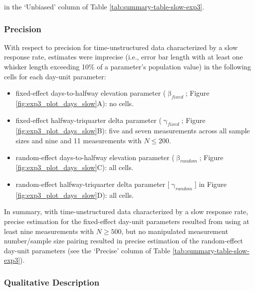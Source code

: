 \documentclass[
12pt, %
twoside,
english]{guelphthesis}
\begin{document}
in the `Unbiased' column of Table \ref{tab:summary-table-slow-exp3}.

\hypertarget{precision-slow-exp3}{%
\subsubsection{Precision}\label{precision-slow-exp3}}

With respect to precision for time-unstructured data characterized by a slow response rate, estimates were imprecise (i.e., error bar length with at least one whisker length exceeding 10\% of a parameter's population value) in the following cells for each day-unit parameter:
\begin{itemize}
\tightlist
\item
  fixed-effect days-to-halfway elevation parameter (\(\upbeta_{fixed}\); Figure \ref{fig:exp3_plot_days_slow}A): no cells.
\item
  fixed-effect halfway-triquarter delta parameter (\(\upgamma_{fixed}\); Figure \ref{fig:exp3_plot_days_slow}B): five and seven measurements across all sample sizes and nine and 11 measurements with \(N \le 200\).
\item
  random-effect days-to-halfway elevation parameter (\(\upbeta_{random}\); Figure \ref{fig:exp3_plot_days_slow}C): all cells.
\item
  random-effect halfway-triquarter delta parameter {[}\(\upgamma_{random}\){]} in Figure \ref{fig:exp3_plot_days_slow}D): all cells.
\end{itemize}
In summary, with time-unstructured data characterized by a slow response rate, precise estimation for the fixed-effect day-unit parameters resulted from using at least nine measurements with \(N \ge 500\), but no manipulated measurement number/sample size pairing resulted in precise estimation of the random-effect day-unit parameters (see the `Precise' column of Table \ref{tab:summary-table-slow-exp3}).

\hypertarget{qualitative-slow-exp3}{%
\subsubsection{Qualitative Description}\label{qualitative-slow-exp3}}
\end{document}
